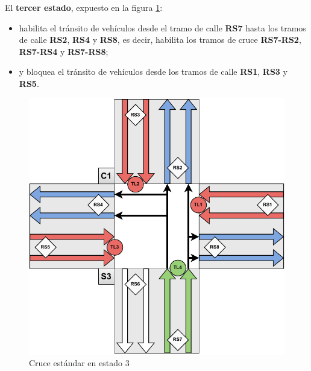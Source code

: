 \newpage
El \textbf{tercer estado}, expuesto en la figura \ref{fig:cruce_estandar_estado_3}:
\begin{itemize}
    \item habilita el tránsito de vehículos desde el tramo de calle \textbf{RS7} hasta los tramos de calle \textbf{RS2}, \textbf{RS4} y \textbf{RS8}, es decir, habilita los tramos de cruce \textbf{RS7-RS2}, \textbf{RS7-RS4} y \textbf{RS7-RS8};
    \item y bloquea el tránsito de vehículos desde los tramos de calle \textbf{RS1}, \textbf{RS3} y \textbf{RS5}.
\end{itemize}
\begin{figure}[H]
    \centering
    \includegraphics[width=1\linewidth]{text/image/DCruc-CE-Estado3.pdf}
    \caption{Cruce estándar en estado 3}
    \label{fig:cruce_estandar_estado_3}
\end{figure}

